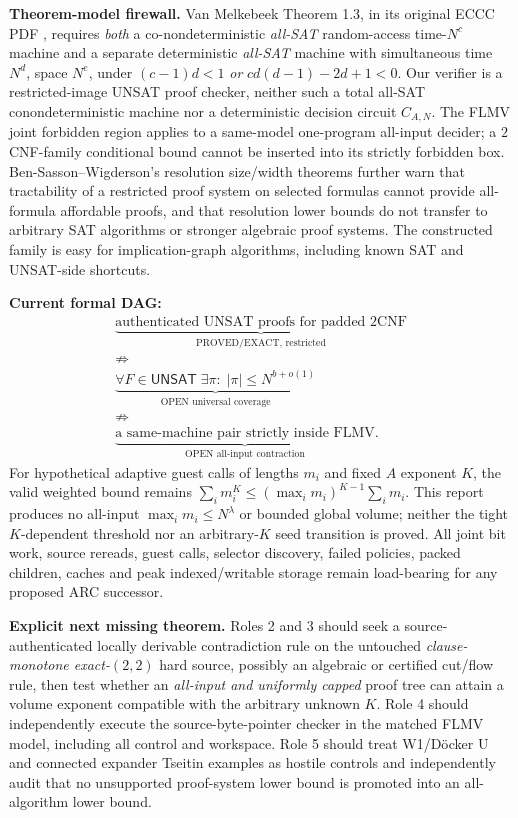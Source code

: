 \documentclass[11pt]{article}
\newcommand{\UNSAT}{\mathsf{UNSAT}}
\begin{document}
\textbf{Theorem-model firewall.} Van Melkebeek Theorem 1.3, in its original ECCC PDF \cite{vanmelkebeek2007}, requires \emph{both} a co-nondeterministic \emph{all-SAT} random-access time-$N^c$ machine and a separate deterministic \emph{all-SAT} machine with simultaneous time $N^d$, space $N^e$, under $(c-1)d<1$ \emph{or} $cd(d-1)-2d+1<0$. Our verifier is a restricted-image UNSAT proof checker, neither such a total all-SAT conondeterministic machine nor a deterministic decision circuit $C_{A,N}$. The FLMV joint forbidden region \cite{flmv2005} applies to a same-model one-program all-input decider; a $2$CNF-family conditional bound cannot be inserted into its strictly forbidden box. Ben-Sasson--Wigderson's resolution size/width theorems \cite{bensasson2001} further warn that tractability of a restricted proof system on selected formulas cannot provide all-formula affordable proofs, and that resolution lower bounds do not transfer to arbitrary SAT algorithms or stronger algebraic proof systems. The constructed family is easy for implication-graph algorithms, including known SAT and UNSAT-side shortcuts.

\textbf{Current formal DAG:}
\[
\begin{gathered}
\underbrace{\text{authenticated UNSAT proofs for padded $2$CNF}}_{\text{PROVED/EXACT, restricted}}\\[2pt]
\nRightarrow\\[-1pt]
\underbrace{\forall F\in\UNSAT\;\exists\pi:\;|\pi|\le N^{b+o(1)}}_{\text{OPEN universal coverage}}\\[2pt]
\nRightarrow\\[-1pt]
\underbrace{\text{a same-machine pair strictly inside FLMV}}_{\text{OPEN all-input contraction}}.
\end{gathered}
\]
For hypothetical adaptive guest calls of lengths $m_i$ and fixed $A$ exponent $K$, the valid weighted bound remains $\sum_i m_i^K\le (\max_i m_i)^{K-1}\sum_i m_i$. This report produces no all-input $\max_i m_i\le N^{\lambda}$ or bounded global volume; neither the tight $K$-dependent threshold nor an arbitrary-$K$ seed transition is proved. All joint bit work, source rereads, guest calls, selector discovery, failed policies, packed children, caches and peak indexed/writable storage remain load-bearing for any proposed ARC successor.

\textbf{Explicit next missing theorem.} Roles 2 and 3 should seek a source-authenticated locally derivable contradiction rule on the untouched \emph{clause-monotone exact-$(2,2)$} hard source, possibly an algebraic or certified cut/flow rule, then test whether an \emph{all-input and uniformly capped} proof tree can attain a volume exponent compatible with the arbitrary unknown $K$. Role 4 should independently execute the source-byte-pointer checker in the matched FLMV model, including all control and workspace. Role 5 should treat W1/D\"ocker U and connected expander Tseitin examples as hostile controls and independently audit that no unsupported proof-system lower bound is promoted into an all-algorithm lower bound.
\end{document}
